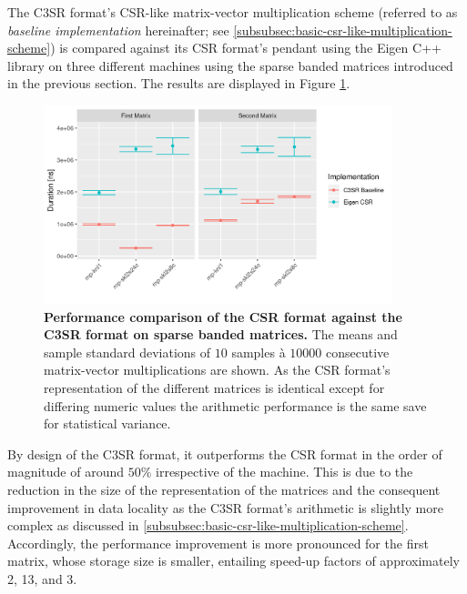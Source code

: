 \documentclass{article}
\begin{document}
    The C3SR format's CSR-like matrix-vector multiplication scheme (referred to as \emph{baseline implementation} hereinafter; see \ref{subsubsec:basic-csr-like-multiplication-scheme}) is compared against its CSR format's pendant using the Eigen C++ library \cite{eigen:website} on three different machines using the sparse banded matrices introduced in the previous section. The results are displayed in Figure \ref{fig:baseline_arithmetic_performance}.

    \begin{figure}[!ht]
      \centering
      \includegraphics[width=0.9\textwidth]{assets/eigen_vs_c3sr_baseline}
      \caption[Performance comparison of the CSR format against the C3SR format on sparse banded matrices.]{\textbf{Performance comparison of the CSR format against the C3SR format on sparse banded matrices.} The means and sample standard deviations of $10$ samples à $10000$ consecutive matrix-vector multiplications are shown. As the CSR format's representation of the different matrices is identical except for differing numeric values the arithmetic performance is the same save for statistical variance.}
      \label{fig:baseline_arithmetic_performance}
    \end{figure}

    By design of the C3SR format, it outperforms the CSR format in the order of magnitude of around $50\%$ irrespective of the machine. This is due to the reduction in the size of the representation of the matrices and the consequent improvement in data locality as the C3SR format's arithmetic is slightly more complex as discussed in \ref{subsubsec:basic-csr-like-multiplication-scheme}. Accordingly, the performance improvement is more pronounced for the first matrix, whose storage size is smaller, entailing speed-up factors of approximately 2, 13, and 3.
\end{document}
